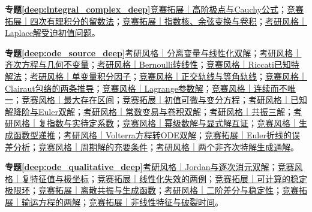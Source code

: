 \par\noindent\textbf{专题\ref{deep:integral_complex_deep}}\quad \hyperref[deep:ex:integral_complex_deep:cauchy]{竞赛拓展｜高阶极点与Cauchy公式}；\hyperref[deep:ex:integral_complex_deep:residue4]{竞赛拓展｜四次有理积分的留数法}；\hyperref[deep:ex:integral_complex_deep:fourierexp]{竞赛拓展｜指数核、余弦变换与卷积}；\hyperref[deep:ex:integral_complex_deep:laplaceode]{考研风格｜Laplace解受迫初值问题}。\par
\par\noindent\textbf{专题\ref{deep:ode_source_deep}}\quad \hyperref[deep:ex:ode_source_deep:logistic]{考研风格｜分离变量与线性化双解}；\hyperref[deep:ex:ode_source_deep:homogeneous]{考研风格｜齐次方程与几何不变量}；\hyperref[deep:ex:ode_source_deep:bernoulli]{考研风格｜Bernoulli转线性}；\hyperref[deep:ex:ode_source_deep:riccati]{竞赛风格｜Riccati已知特解法}；\hyperref[deep:ex:ode_source_deep:factor]{考研风格｜单变量积分因子}；\hyperref[deep:ex:ode_source_deep:orthogonal]{竞赛风格｜正交轨线与等角轨线}；\hyperref[deep:ex:ode_source_deep:clairaut]{竞赛风格｜Clairaut包络的两条推导}；\hyperref[deep:ex:ode_source_deep:lagrange]{竞赛风格｜Lagrange参数解}；\hyperref[deep:ex:ode_source_deep:nonunique]{竞赛风格｜连续而不唯一}；\hyperref[deep:ex:ode_source_deep:blowup]{竞赛风格｜最大存在区间}；\hyperref[deep:ex:ode_source_deep:sensitivity]{竞赛拓展｜初值可微与变分方程}；\hyperref[deep:ex:ode_source_deep:reduction]{考研风格｜已知解降阶与Euler双解}；\hyperref[deep:ex:ode_source_deep:variation]{考研风格｜常数变易与卷积双解}；\hyperref[deep:ex:ode_source_deep:resonance]{考研风格｜共振三解}；\hyperref[deep:ex:ode_source_deep:complexforce]{考研风格｜复指数与实待定系数}；\hyperref[deep:ex:ode_source_deep:power]{竞赛风格｜幂级数解与显式解互证}；\hyperref[deep:ex:ode_source_deep:generating]{竞赛风格｜生成函数型递推}；\hyperref[deep:ex:ode_source_deep:volterra]{考研风格｜Volterra方程转ODE双解}；\hyperref[deep:ex:ode_source_deep:eulerscheme]{竞赛拓展｜Euler折线的误差分析}；\hyperref[deep:ex:ode_source_deep:periodicA]{竞赛风格｜周期解的充要条件}；\hyperref[deep:ex:ode_source_deep:twosolutions]{考研风格｜两个非齐次特解生成通解}。\par
\par\noindent\textbf{专题\ref{deep:ode_qualitative_deep}}\quad \hyperref[deep:ex:ode_qualitative_deep:jordan]{考研风格｜Jordan与逐次消元双解}；\hyperref[deep:ex:ode_qualitative_deep:rotation]{竞赛风格｜复特征值与极坐标}；\hyperref[deep:ex:ode_qualitative_deep:nonhyperbolic]{竞赛拓展｜线性化失效的两例}；\hyperref[deep:ex:ode_qualitative_deep:limitcycle]{竞赛拓展｜可计算的稳定极限环}；\hyperref[deep:ex:ode_qualitative_deep:diffresonance]{竞赛拓展｜离散共振与生成函数}；\hyperref[deep:ex:ode_qualitative_deep:secondrec]{考研风格｜二阶差分与稳定性}；\hyperref[deep:ex:ode_qualitative_deep:transport]{竞赛拓展｜输运方程的两解}；\hyperref[deep:ex:ode_qualitative_deep:quasilinear]{竞赛拓展｜非线性特征与破裂时间}。\par
